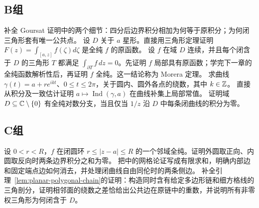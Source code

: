 \subsection*{B组}
\begin{enumerate}[label=\textbf{\thechapter.\arabic*.},resume]
补全 Goursat 证明中的两个细节：四分后边界积分相加为何等于原积分；为何闭三角形套有唯一公共点。
设 \(D\) 关于 \(a\) 星形。直接用三角形定理证明 \(F(z)=\int_{[a,z]}f(\zeta)d\zeta\) 是全纯 \(f\) 的原函数。
设 \(f\) 在域 \(D\) 连续，并且每个闭含于 \(D\) 的三角形 \(T\) 都满足 \(\int_{\partial T}f\,dz=0\)。先证明 \(f\) 局部具有原函数；学完下一章的全纯函数解析性后，再证明 \(f\) 全纯。这一结论称为 Morera 定理。
求曲线 \(\gamma(t)=a+re^{ikt}\)、\(0\le t\le2\pi\)，关于圆内、圆外各点的绕数，其中 \(k\in\mathbb{Z}\)。
直接从积分及一致估计证明 \(a\mapsto\operatorname{Ind}(\gamma,a)\) 在曲线补集上局部常值。
证明域 \(D\subseteq\mathbb{C}\setminus\{0\}\) 有全纯对数分支，当且仅当 \(1/z\) 沿 \(D\) 中每条闭曲线的积分为零。
\end{enumerate}
\subsection*{C组}
\begin{enumerate}[label=\textbf{\thechapter.\arabic*.},resume]
设 \(0<r<R\)，\(f\) 在闭圆环 \(r\le|z-a|\le R\) 的一个邻域全纯。证明外圆取正向、内圆取反向时两条边界积分之和为零。
把中的网格论证写成有限求和，明确内部边和固定端点边如何消去，并处理闭曲线自由同伦时的两条侧边。
补全引理~\ref{lem:planar-polygonal-chain}的证明：构造同时含有给定多边形链和细方格线的三角剖分，证明相邻面的绕数之差恰给出公共边在原链中的重数，并说明所有非零权三角形为何闭含于 \(D\)。
\end{enumerate}
